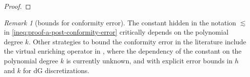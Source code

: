 \documentclass[a4paper]{amsart}
\numberwithin{equation}{section}
\def\T{\mathcal{T}}
\def\pw{\mathrm{pw}}
\theoremstyle{definition}
\theoremstyle{remark}
\newtheorem{remark}[theorem]{Remark}
\numberwithin{theorem}{section}
\numberwithin{equation}{section}
\numberwithin{table}{section}
\numberwithin{figure}{section}
\begin{document}
\begin{proof}
\end{proof}

\begin{remark}[bounds for conformity error]
    The constant hidden in the notation $\lesssim$ in \eqref{ineq:proof-a-post-conformity-error} critically depends on the polynomial degree $k$. Other strategies to bound the conformity error in the literature include the virtual enriching operator in \cite{BrennerSung2019}, where the dependency of the constant on the polynomial degree $k$ is currently unknown, and \cite{DongMascottoSutton2021} with explicit error bounds in $h$ and $k$ for dG discretizations.
\end{remark}
\end{document}
